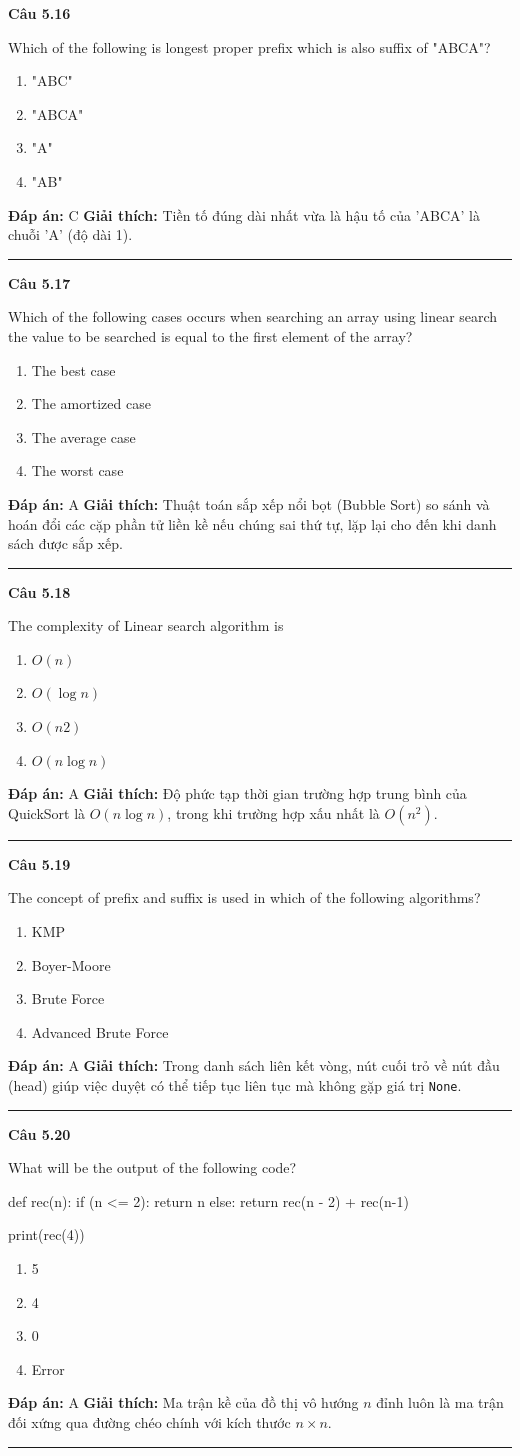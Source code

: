 \documentclass[11pt,a4paper]{article}
\newenvironment{question}[1]{%
  \par\vspace{1em}\noindent\textbf{\large Câu #1}\par\vspace{0.4em}
}{%
  \par\vspace{1em}\hrule\vspace{0.6em}
}
\newenvironment{choices}{%
  \begin{enumerate}[label=\textbf{\Alph*.},leftmargin=2.2em,itemsep=2pt,topsep=3pt]
}{%
  \end{enumerate}
}
\newcommand{\choice}{\item}
\newenvironment{codebox}{%
  \begin{tcolorbox}[colback=gray!8!white,colframe=gray!50!black,arc=1.5mm,boxrule=0.6pt,left=3mm,right=3mm,top=2.5mm,bottom=2.5mm]
  \ttfamily\small
}{%
  \end{tcolorbox}
}
\begin{document}
\begin{question}{5.16}
Which of the following is longest proper prefix which is also suffix of "ABCA"?
\begin{choices}
\choice "ABC"
\choice "ABCA"
\choice "A"
\choice "AB"
\end{choices}
\textbf{Đáp án:} C
\textbf{Giải thích:} Tiền tố đúng dài nhất vừa là hậu tố của 'ABCA' là chuỗi 'A' (độ dài 1).
\end{question}

\begin{question}{5.17}
Which of the following cases occurs when searching an array using linear search the value to be searched is equal to the first element of the array?
\begin{choices}
\choice The best case
\choice The amortized case
\choice The average case
\choice The worst case
\end{choices}
\textbf{Đáp án:} A
\textbf{Giải thích:} Thuật toán sắp xếp nổi bọt (Bubble Sort) so sánh và hoán đổi các cặp phần tử liền kề nếu chúng sai thứ tự, lặp lại cho đến khi danh sách được sắp xếp.
\end{question}

\begin{question}{5.18}
The complexity of Linear search algorithm is
\begin{choices}
\choice $O(n)$
\choice $O(\log n)$
\choice $O(n2)$
\choice $O(n \log n)$
\end{choices}
\textbf{Đáp án:} A
\textbf{Giải thích:} Độ phức tạp thời gian trường hợp trung bình của QuickSort là $O(n \log n)$, trong khi trường hợp xấu nhất là $O(n^2)$.
\end{question}

\begin{question}{5.19}
The concept of prefix and suffix is used in which of the following algorithms?
\begin{choices}
\choice KMP
\choice Boyer-Moore
\choice Brute Force
\choice Advanced Brute Force
\end{choices}
\textbf{Đáp án:} A
\textbf{Giải thích:} Trong danh sách liên kết vòng, nút cuối trỏ về nút đầu (head) giúp việc duyệt có thể tiếp tục liên tục mà không gặp giá trị \texttt{None}.
\end{question}

\begin{question}{5.20}
What will be the output of the following code?
\begin{codebox}
def rec(n):
    if (n <= 2):
        return n
    else:
        return rec(n - 2) + rec(n-1)

print(rec(4))
\end{codebox}
\begin{choices}
\choice 5
\choice 4
\choice 0
\choice Error
\end{choices}
\textbf{Đáp án:} A
\textbf{Giải thích:} Ma trận kề của đồ thị vô hướng $n$ đỉnh luôn là ma trận đối xứng qua đường chéo chính với kích thước $n \times n$.
\end{question}
\end{document}
